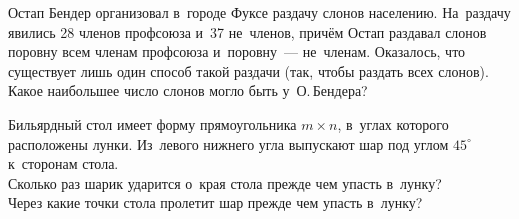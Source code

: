 \begin{problems}
\item
Остап Бендер организовал в~городе Фуксе раздачу слонов населению.
На~раздачу явились 28 членов профсоюза и~37 не~членов, причём Остап раздавал
слонов поровну всем членам профсоюза и~поровну~--- не~членам.
Оказалось, что существует лишь один способ такой раздачи (так, чтобы раздать
всех слонов).
Какое наибольшее число слонов могло быть у~О.\,Бендера?

\item
Бильярдный стол имеет форму прямоугольника $m \times n$, в~углах которого
расположены лунки.
Из~левого нижнего угла выпускают шар под углом $45^\circ$ к~сторонам стола.
\\
\subproblem
Сколько раз шарик ударится о~края стола прежде чем упасть в~лунку?
\\
\subproblem
Через какие точки стола пролетит шар прежде чем упасть в~лунку?

\end{problems}

